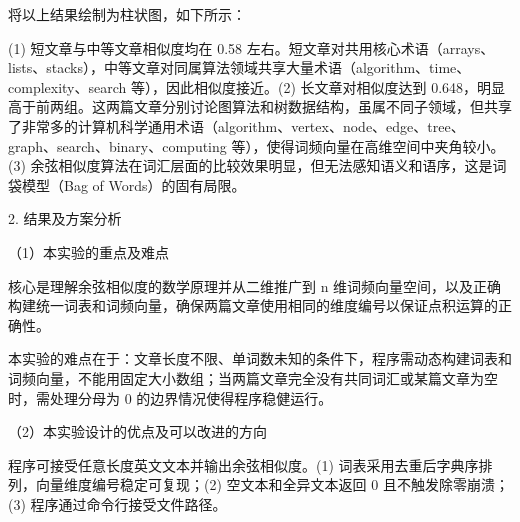 \noindent\hspace*{2em}将以上结果绘制为柱状图，如下所示：\par
\begin{center}
\end{center}
\noindent\hspace*{2em}(1) 短文章与中等文章相似度均在 0.58 左右。短文章对共用核心术语（arrays、lists、stacks），中等文章对同属算法领域共享大量术语（algorithm、time、complexity、search 等），因此相似度接近。(2) 长文章对相似度达到 0.648，明显高于前两组。这两篇文章分别讨论图算法和树数据结构，虽属不同子领域，但共享了非常多的计算机科学通用术语（algorithm、vertex、node、edge、tree、graph、search、binary、computing 等），使得词频向量在高维空间中夹角较小。(3) 余弦相似度算法在词汇层面的比较效果明显，但无法感知语义和语序，这是词袋模型（Bag of Words）的固有局限。\par
\noindent\hspace*{2em}2. 结果及方案分析\par
\noindent\hspace*{2em}（1）本实验的重点及难点\par
\noindent\hspace*{2em}核心是理解余弦相似度的数学原理并从二维推广到 n 维词频向量空间，以及正确构建统一词表和词频向量，确保两篇文章使用相同的维度编号以保证点积运算的正确性。\par
\noindent\hspace*{2em}本实验的难点在于：文章长度不限、单词数未知的条件下，程序需动态构建词表和词频向量，不能用固定大小数组；当两篇文章完全没有共同词汇或某篇文章为空时，需处理分母为 0 的边界情况使得程序稳健运行。\par
\noindent\hspace*{2em}（2）本实验设计的优点及可以改进的方向\par
\noindent\hspace*{2em}程序可接受任意长度英文文本并输出余弦相似度。(1) 词表采用去重后字典序排列，向量维度编号稳定可复现；(2) 空文本和全异文本返回 0 且不触发除零崩溃；(3) 程序通过命令行接受文件路径。\par
